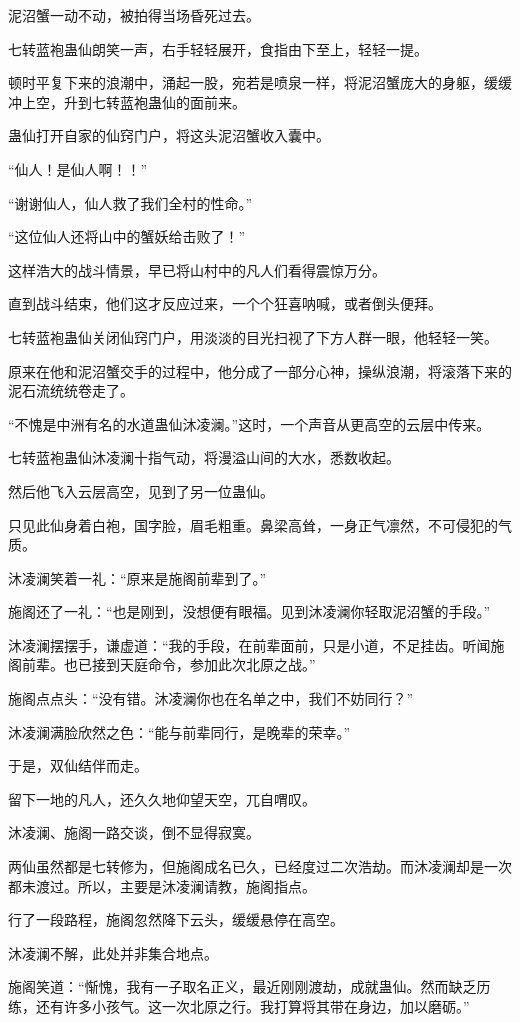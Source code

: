 \begin{this_body}
泥沼蟹一动不动，被拍得当场昏死过去。

七转蓝袍蛊仙朗笑一声，右手轻轻展开，食指由下至上，轻轻一提。

顿时平复下来的浪潮中，涌起一股，宛若是喷泉一样，将泥沼蟹庞大的身躯，缓缓冲上空，升到七转蓝袍蛊仙的面前来。

蛊仙打开自家的仙窍门户，将这头泥沼蟹收入囊中。

“仙人！是仙人啊！！”

“谢谢仙人，仙人救了我们全村的性命。”

“这位仙人还将山中的蟹妖给击败了！”

这样浩大的战斗情景，早已将山村中的凡人们看得震惊万分。

直到战斗结束，他们这才反应过来，一个个狂喜呐喊，或者倒头便拜。

七转蓝袍蛊仙关闭仙窍门户，用淡淡的目光扫视了下方人群一眼，他轻轻一笑。

原来在他和泥沼蟹交手的过程中，他分成了一部分心神，操纵浪潮，将滚落下来的泥石流统统卷走了。

“不愧是中洲有名的水道蛊仙沐凌澜。”这时，一个声音从更高空的云层中传来。

七转蓝袍蛊仙沐凌澜十指气动，将漫溢山间的大水，悉数收起。

然后他飞入云层高空，见到了另一位蛊仙。

只见此仙身着白袍，国字脸，眉毛粗重。鼻梁高耸，一身正气凛然，不可侵犯的气质。

沐凌澜笑着一礼：“原来是施阁前辈到了。”

施阁还了一礼：“也是刚到，没想便有眼福。见到沐凌澜你轻取泥沼蟹的手段。”

沐凌澜摆摆手，谦虚道：“我的手段，在前辈面前，只是小道，不足挂齿。听闻施阁前辈。也已接到天庭命令，参加此次北原之战。”

施阁点点头：“没有错。沐凌澜你也在名单之中，我们不妨同行？”

沐凌澜满脸欣然之色：“能与前辈同行，是晚辈的荣幸。”

于是，双仙结伴而走。

留下一地的凡人，还久久地仰望天空，兀自喟叹。

沐凌澜、施阁一路交谈，倒不显得寂寞。

两仙虽然都是七转修为，但施阁成名已久，已经度过二次浩劫。而沐凌澜却是一次都未渡过。所以，主要是沐凌澜请教，施阁指点。

行了一段路程，施阁忽然降下云头，缓缓悬停在高空。

沐凌澜不解，此处并非集合地点。

施阁笑道：“惭愧，我有一子取名正义，最近刚刚渡劫，成就蛊仙。然而缺乏历练，还有许多小孩气。这一次北原之行。我打算将其带在身边，加以磨砺。”


\end{this_body}
